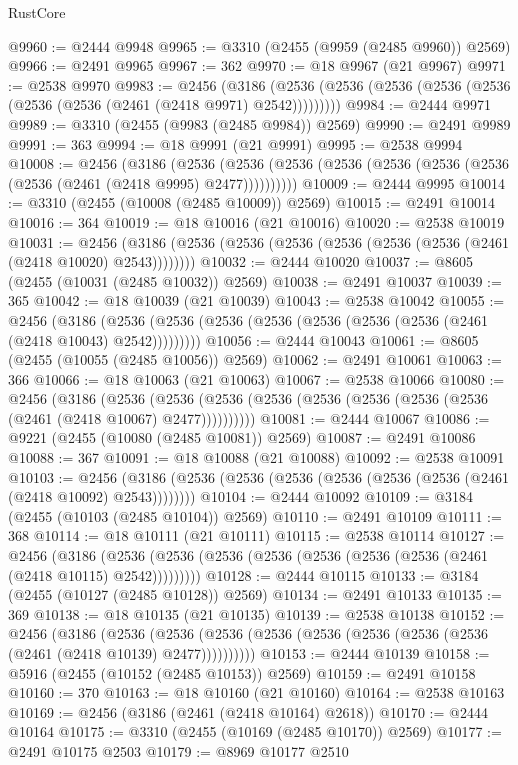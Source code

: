 \begin{lexlean}{RustCore}
\begin{coremodule}
@9960 := @2444 @9948
@9965 := @3310 (@2455 (@9959 (@2485 @9960)) @2569)
@9966 := @2491 @9965
@9967 := 362
@9970 := @18 @9967 (@21 @9967)
@9971 := @2538 @9970
@9983 := @2456
    (@3186 (@2536 (@2536 (@2536 (@2536 (@2536 (@2536 (@2536 (@2461 (@2418 @9971) @2542)))))))))
@9984 := @2444 @9971
@9989 := @3310 (@2455 (@9983 (@2485 @9984)) @2569)
@9990 := @2491 @9989
@9991 := 363
@9994 := @18 @9991 (@21 @9991)
@9995 := @2538 @9994
@10008 := @2456
    (@3186
      (@2536 (@2536 (@2536 (@2536 (@2536 (@2536 (@2536 (@2536 (@2461 (@2418 @9995) @2477))))))))))
@10009 := @2444 @9995
@10014 := @3310 (@2455 (@10008 (@2485 @10009)) @2569)
@10015 := @2491 @10014
@10016 := 364
@10019 := @18 @10016 (@21 @10016)
@10020 := @2538 @10019
@10031 := @2456 (@3186 (@2536 (@2536 (@2536 (@2536 (@2536 (@2536 (@2461 (@2418 @10020) @2543))))))))
@10032 := @2444 @10020
@10037 := @8605 (@2455 (@10031 (@2485 @10032)) @2569)
@10038 := @2491 @10037
@10039 := 365
@10042 := @18 @10039 (@21 @10039)
@10043 := @2538 @10042
@10055 := @2456
    (@3186 (@2536 (@2536 (@2536 (@2536 (@2536 (@2536 (@2536 (@2461 (@2418 @10043) @2542)))))))))
@10056 := @2444 @10043
@10061 := @8605 (@2455 (@10055 (@2485 @10056)) @2569)
@10062 := @2491 @10061
@10063 := 366
@10066 := @18 @10063 (@21 @10063)
@10067 := @2538 @10066
@10080 := @2456
    (@3186
      (@2536 (@2536 (@2536 (@2536 (@2536 (@2536 (@2536 (@2536 (@2461 (@2418 @10067) @2477))))))))))
@10081 := @2444 @10067
@10086 := @9221 (@2455 (@10080 (@2485 @10081)) @2569)
@10087 := @2491 @10086
@10088 := 367
@10091 := @18 @10088 (@21 @10088)
@10092 := @2538 @10091
@10103 := @2456 (@3186 (@2536 (@2536 (@2536 (@2536 (@2536 (@2536 (@2461 (@2418 @10092) @2543))))))))
@10104 := @2444 @10092
@10109 := @3184 (@2455 (@10103 (@2485 @10104)) @2569)
@10110 := @2491 @10109
@10111 := 368
@10114 := @18 @10111 (@21 @10111)
@10115 := @2538 @10114
@10127 := @2456
    (@3186 (@2536 (@2536 (@2536 (@2536 (@2536 (@2536 (@2536 (@2461 (@2418 @10115) @2542)))))))))
@10128 := @2444 @10115
@10133 := @3184 (@2455 (@10127 (@2485 @10128)) @2569)
@10134 := @2491 @10133
@10135 := 369
@10138 := @18 @10135 (@21 @10135)
@10139 := @2538 @10138
@10152 := @2456
    (@3186
      (@2536 (@2536 (@2536 (@2536 (@2536 (@2536 (@2536 (@2536 (@2461 (@2418 @10139) @2477))))))))))
@10153 := @2444 @10139
@10158 := @5916 (@2455 (@10152 (@2485 @10153)) @2569)
@10159 := @2491 @10158
@10160 := 370
@10163 := @18 @10160 (@21 @10160)
@10164 := @2538 @10163
@10169 := @2456 (@3186 (@2461 (@2418 @10164) @2618))
@10170 := @2444 @10164
@10175 := @3310 (@2455 (@10169 (@2485 @10170)) @2569)
@10177 := @2491 @10175 @2503
@10179 := @8969 @10177 @2510

\end{coremodule}
\end{lexlean}
